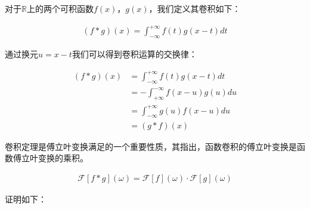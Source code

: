 \documentclass[UTF8]{book}
\begin{document}
对于$\mathbb{R}$上的两个可积函数$f(x)$，$g(x)$，我们定义其卷积如下：
\begin{large}
    \begin{equation}
        \begin{aligned}
            (f * g)(x)=\int_{-\infty}^{+\infty}f(t)g(x-t)dt
            \nonumber
        \end{aligned}
    \end{equation}
\end{large}
通过换元$u=x-t$我们可以得到卷积运算的交换律：
\begin{large}
    \begin{equation}
        \begin{aligned}
            (f * g)(x) &= \int_{-\infty}^{+\infty}f(t)g(x-t)dt \\
            &= -\int_{+\infty}^{-\infty}f(x-u)g(u)du \\
            &= \int_{-\infty}^{+\infty}g(u)f(x-u)du \\
            &= (g * f)(x)
            \nonumber
        \end{aligned}
    \end{equation}
\end{large}
卷积定理是傅立叶变换满足的一个重要性质，其指出，函数卷积的傅立叶变换是函数傅立叶变换的乘积。
\begin{large}
    \begin{equation}
        \begin{aligned}
            \mathcal{F}\left [f * g \right ](\omega)=\mathcal{F}\left [f\right ](\omega) \cdot \mathcal{F}\left [g\right ](\omega)
            \nonumber
        \end{aligned}
    \end{equation}
\end{large}
证明如下：
\end{document}
